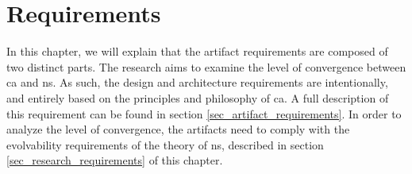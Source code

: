\chapter{Requirements} \label{chap_requirements} 

In this chapter, we will explain that the artifact requirements are composed of two
distinct parts. The research aims to examine the level of convergence between \gls{ca} and
\gls{ns}. As such, the design and architecture requirements are intentionally, and entirely 
based on the principles and philosophy of \gls{ca}. A full description of this requirement
can be found in section \ref{sec_artifact_requirements}. In order to analyze the level of
convergence, the artifacts need to comply with the evolvability requirements of the theory
of \gls{ns}, described in section \ref{sec_research_requirements} of this chapter.


